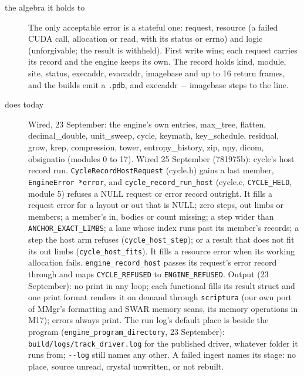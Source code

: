 \begin{description}
\item[{the algebra it holds to}] The only acceptable error is a stateful one: request, resource (a failed CUDA call, allocation or read, with its status or errno) and logic (unforgivable; the result is withheld). First write wins; each request carries its record and the engine keeps its own. The record holds kind, module, site, status, execaddr, evacaddr, imagebase and up to 16 return frames, and the builds emit a \texttt{.\allowbreak{}pdb}, and execaddr − imagebase steps to the line.
\item[{does today}] Wired, 23 September: the engine's own entries, max\_\allowbreak{}tree, flatten, decimal\_\allowbreak{}double, unit\_\allowbreak{}sweep, cycle, keymath, key\_\allowbreak{}schedule, residual, grow, krep, compression, tower, entropy\_\allowbreak{}history, zip, npy, dicom, obsignatio (modules 0 to 17). Wired 25 September (781975b): cycle's host record run. \texttt{Cycle\allowbreak{}Record\allowbreak{}Host\allowbreak{}Request} (cycle.h) gains a last member, \texttt{Engine\allowbreak{}Error *error}, and \texttt{cycle\_\allowbreak{}record\_\allowbreak{}run\_\allowbreak{}host} (cycle.c, \texttt{CYCLE\_\allowbreak{}HELD}, module 5) refuses a NULL request or error record outright. It fills a request error for a layout or out that is NULL; zero steps, out limbs or members; a member's in, bodies or count missing; a step wider than \texttt{ANCHOR\_\allowbreak{}EXACT\_\allowbreak{}LIMBS}; a lane whose index runs past its member's records; a step the host arm refuses (\texttt{cycle\_\allowbreak{}host\_\allowbreak{}step}); or a result that does not fit its out limbs (\texttt{cycle\_\allowbreak{}host\_\allowbreak{}fits}). It fills a resource error when its working allocation fails. \texttt{engine\_\allowbreak{}record\_\allowbreak{}host} passes its request's error record through and maps \texttt{CYCLE\_\allowbreak{}REFUSED} to \texttt{ENGINE\_\allowbreak{}REFUSED}. Output (23 September): no print in any loop; each functional fills its result struct and one print format renders it on demand through \texttt{scriptura} (our own port of MMgr's formatting and SWAR memory scans, its memory operations in M17); errors always print. The run log's default place is beside the program (\texttt{engine\_\allowbreak{}program\_\allowbreak{}directory}, 23 September): \texttt{build/\allowbreak{}logs/\allowbreak{}track\_\allowbreak{}driver.\allowbreak{}log} for the published driver, whatever folder it runs from; \texttt{-\allowbreak{}-\allowbreak{}log} still names any other. A failed ingest names its stage: no place, source unread, crystal unwritten, or not rebuilt.

\end{description}
